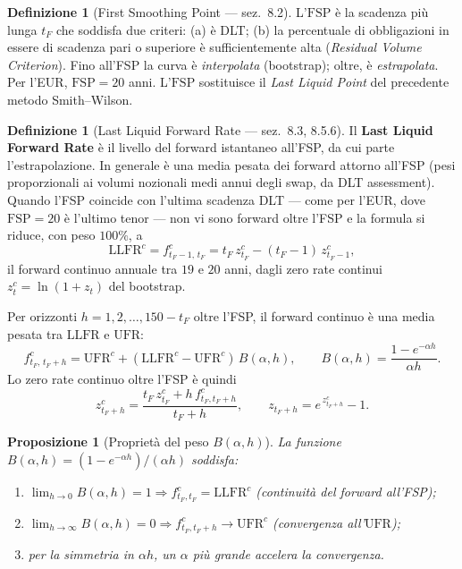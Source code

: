 \documentclass[11pt,a4paper]{article}
\theoremstyle{plain}
\newtheorem{proposizione}[teorema]{Proposizione}
\theoremstyle{definition}
\newtheorem{definizione}[teorema]{Definizione}
\theoremstyle{remark}
\newcommand{\UFR}{\mathrm{UFR}}
\newcommand{\LLFR}{\mathrm{LLFR}}
\newcommand{\FSP}{\mathrm{FSP}}
\begin{document}
\begin{definizione}[First Smoothing Point --- sez.~8.2]
L'$\FSP$ \`e la scadenza pi\`u lunga $t_F$ che soddisfa due criteri: (a) \`e DLT; (b) la
percentuale di obbligazioni in essere di scadenza pari o superiore \`e sufficientemente alta
(\emph{Residual Volume Criterion}). Fino all'FSP la curva \`e \emph{interpolata} (bootstrap);
oltre, \`e \emph{estrapolata}. Per l'EUR, $\FSP=20$ anni. L'$\FSP$ sostituisce il
\emph{Last Liquid Point} del precedente metodo Smith--Wilson.
\end{definizione}

\begin{definizione}[Last Liquid Forward Rate --- sez.~8.3, 8.5.6]
\label{def:llfr}
Il \textbf{Last Liquid Forward Rate} \`e il livello del forward istantaneo all'FSP, da cui
parte l'estrapolazione. In generale \`e una media pesata dei forward attorno all'FSP (pesi
proporzionali ai volumi nozionali medi annui degli swap, da DLT assessment). Quando l'FSP
coincide con l'ultima scadenza DLT --- come per l'EUR, dove $\FSP=20$ \`e l'ultimo tenor ---
non vi sono forward oltre l'FSP e la formula si riduce, con peso $100\%$, a
\begin{equation}
  \label{eq:llfr}
  \LLFR^c = f^c_{t_F-1,\,t_F} = t_F\,z^c_{t_F} - (t_F-1)\,z^c_{t_F-1},
\end{equation}
il forward continuo annuale tra $19$ e $20$ anni, dagli zero rate continui $z^c_t=\ln(1+z_t)$
del bootstrap.
\end{definizione}

\begin{keybox}
Per orizzonti $h=1,2,\ldots,150-t_F$ oltre l'FSP, il forward continuo \`e una media pesata tra
$\LLFR$ e $\UFR$:
\begin{equation}
  f^c_{t_F,\,t_F+h} = \UFR^c + (\LLFR^c - \UFR^c)\,B(\alpha,h),
  \qquad
  B(\alpha,h) = \frac{1 - e^{-\alpha h}}{\alpha h}.
  \label{eq:extrap-fwd}
\end{equation}
Lo zero rate continuo oltre l'FSP \`e quindi
\begin{equation}
  \label{eq:extrap-zero}
  z^c_{t_F+h} = \frac{t_F\,z^c_{t_F} + h\,f^c_{t_F,t_F+h}}{t_F+h},
  \qquad
  z_{t_F+h} = e^{\,z^c_{t_F+h}} - 1.
\end{equation}
\end{keybox}

\begin{proposizione}[Propriet\`a del peso $B(\alpha,h)$]
\label{prop:Bah}
La funzione $B(\alpha,h)=(1-e^{-\alpha h})/(\alpha h)$ soddisfa:
\begin{enumerate}
  \item $\lim_{h\to 0} B(\alpha,h)=1 \Rightarrow f^c_{t_F,t_F}=\LLFR^c$ (continuit\`a del
        forward all'FSP);
  \item $\lim_{h\to\infty} B(\alpha,h)=0 \Rightarrow f^c_{t_F,t_F+h}\to\UFR^c$ (convergenza
        all'$\UFR$);
  \item per la simmetria in $\alpha h$, un $\alpha$ pi\`u grande accelera la convergenza.
\end{enumerate}
\end{proposizione}
\end{document}
